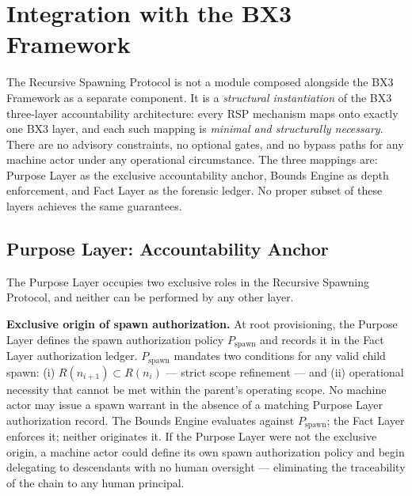\section{Integration with the BX3 Framework}
\label{sec:rs-integration}

The Recursive Spawning Protocol is not a module composed alongside the BX3 Framework as a separate component. It is a \emph{structural instantiation} of the BX3 three-layer accountability architecture: every RSP mechanism maps onto exactly one BX3 layer, and each such mapping is \emph{minimal and structurally necessary}. There are no advisory constraints, no optional gates, and no bypass paths for any machine actor under any operational circumstance. The three mappings are: Purpose Layer as the exclusive accountability anchor, Bounds Engine as depth enforcement, and Fact Layer as the forensic ledger. No proper subset of these layers achieves the same guarantees.

\subsection{Purpose Layer: Accountability Anchor}
\label{sec:rs-purpose-anchor}

The Purpose Layer occupies two exclusive roles in the Recursive Spawning Protocol, and neither can be performed by any other layer.

\medskip
\noindent\textbf{Exclusive origin of spawn authorization.} At root provisioning, the Purpose Layer defines the spawn authorization policy $P_{\mathrm{spawn}}$ and records it in the Fact Layer authorization ledger. $P_{\mathrm{spawn}}$ mandates two conditions for any valid child spawn: (i) $R(n_{i+1}) \subset R(n_i)$ — strict scope refinement — and (ii) operational necessity that cannot be met within the parent's operating scope. No machine actor may issue a spawn warrant in the absence of a matching Purpose Layer authorization record. The Bounds Engine evaluates against $P_{\mathrm{spawn}}$; the Fact Layer enforces it; neither originates it. If the Purpose Layer were not the exclusive origin, a machine actor could define its own spawn authorization policy and begin delegating to descendants with no human oversight — eliminating the traceability of the chain to any human principal.

